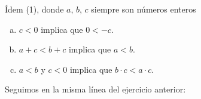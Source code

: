 \begin{problem}{}{}

    Ídem (1), donde $a$, $b$, $c$ siempre son números enteros

    \begin{enumerate}[(a)]
        \item $c < 0$ implica que $0 < -c$.
        \item $a + c < b + c$ implica que $a < b$.
        \item $a < b$ y $c < 0$ implica que $b \cdot c < a \cdot c$.
    \end{enumerate}

\end{problem}
\vspace{1ex}

Seguimos en la misma línea del ejercicio anterior:

